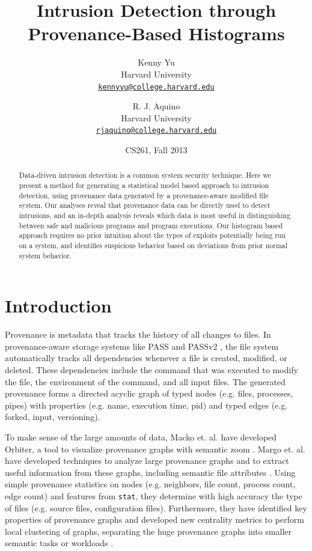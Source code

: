 \documentclass[10pt,twocolumn]{article}
\title{{\bf Intrusion Detection through Provenance-Based Histograms}}
\author{
    Kenny Yu\\
    Harvard University\\
    \href{mailto:kennyyu@college.harvard.edu}{\texttt{kennyyu@college.harvard.edu}}
  \and
    R. J. Aquino\\
    Harvard University\\
    \href{mailto:rjaquino@college.harvard.edu}{\texttt{rjaquino@college.harvard.edu}}
}
\date{CS261, Fall 2013}
\begin{document}
\maketitle

%

\begin{abstract}
Data-driven intrusion detection is a common system security technique. Here we present a method for generating a statistical model based approach to intrusion detection, using provenance data generated by a provenance-aware modified file system. Our analyses reveal that provenance data can be directly used to detect intrusions, and an in-depth analysis reveals which data is most useful in distinguishing between safe and malicious programs and program executions. Our histogram based approach requires no prior intuition about the types of exploits potentially being run on a system, and identifies suspicious behavior based on deviations from prior normal system behavior.
\end{abstract}

%

\section{Introduction}
Provenance is metadata that tracks the history of all changes to files. In provenance-aware storage systems like PASS \cite{pass} and PASSv2 \cite{passv2}, the file system automatically tracks all dependencies whenever a file is created, modified, or deleted. These dependencies include the command that was executed to modify the file, the environment of the command, and all input files. The generated provenance forms a directed acyclic graph of typed nodes (e.g. files, processes, pipes) with properties (e.g. name, execution time, pid) and typed edges (e.g. forked, input, versioning). 

To make sense of the large amounts of data, Macko et. al. have developed Orbiter, a tool to visualize provenance graphs with semantic zoom \cite{orbiter}. Margo et. al. have developed techniques to analyze large provenance graphs and to extract useful information from these graphs, including semantic file attributes \cite{fileattributes}. Using simple provenance statistics on nodes (e.g. neighbors, file count, process count, edge count) and features from \texttt{stat}, they determine with high accuracy the type of files (e.g. source files, configuration files). Furthermore, they have identified key properties of provenance graphs and developed new centrality metrics to perform local clustering of graphs, separating the huge provenance graphs into smaller semantic tasks or workloads \cite{clustering}.
\end{document}
